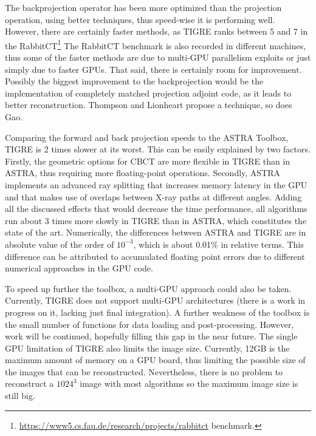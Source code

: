 The backprojection operator has been more optimized than the projection operation, using better techniques, thus speed-wise it is performing well. However, there are certainly faster methods, as TIGRE ranks between 5 and 7 in the RabbitCT\footnote{\href{https://www5.cs.fau.de/research/projects/rabbitct}{https://www5.cs.fau.de/research/projects/rabbitct} benchmark.} The RabbitCT benchmark is also recorded in different machines, thus some of the faster methods are due to multi-GPU parallelism exploits or just simply due to faster GPUs. That said, there is certainly room for improvement. 
Possibly the biggest improvement to the backprojection  would be the implementation of completely matched projection adjoint code, as it leads to better reconstruction\cite{6829349}. Thompson and Lionheart\cite{thompson2014gpu} propose a technique, so does Gao\cite{gao2012fast}.

Comparing the forward and back projection speeds to the ASTRA Toolbox\cite{ASTRA}, TIGRE is 2 times slower at its worst. This can be easily explained by two factors. Firstly, the geometric options for CBCT are more flexible in TIGRE than in ASTRA, thus requiring more floating-point operations. Secondly, ASTRA implements an advanced ray splitting that increases memory latency in the GPU and that makes use of overlaps between X-ray paths at different angles\cite{Palenstijn2011250}. Adding all the discussed effects that would decrease the time performance, all algorithms run about 3 times more slowly in TIGRE than in ASTRA, which constitutes the state of the art. {Numerically, the differences between ASTRA and TIGRE are in absolute value of the order of $10^{-3}$, which is about 0.01\% in relative terms. This difference can be attributed to accumulated floating point errors due to different numerical approaches in the GPU code.}

To speed up further the toolbox, a multi-GPU approach could also be taken. Currently, TIGRE does not support multi-GPU architectures (there is a work in progress on it, lacking just final integration). A further weakness of the toolbox is the small number of functions for data loading and post-processing. However, work will be continued, hopefully filling this gap in the near future. The single GPU limitation of TIGRE also limits the image size. Currently, 12GB is the maximum amount of memory on a GPU board, thus limiting the possible size of the images that can be reconstructed. Nevertheless, there is no problem to reconstruct a $1024^3$ image with most algorithms so the maximum image size is still big.

